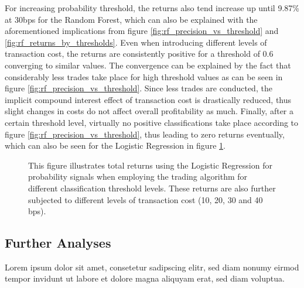 For increasing probability threshold, the returns also tend increase up until 9.87\% at 30bps for the Random Forest, 
which can also be explained with the aforementioned implications 
from figure \ref{fig:rf_precision_vs_threshold} and \ref{fig:rf_returns_by_thresholds}. 
Even when introducing different levels of transaction cost, the returns are consistently positive
for a threshold of 0.6 converging to similar values. 
The convergence can be explained by the fact that considerably less trades take place for high threshold values as can be seen in figure \ref{fig:rf_precision_vs_threshold}.
Since less trades are conducted, the implicit compound interest effect of transaction cost is drastically reduced,
thus slight changes in costs do not affect overall profitability as much. 
Finally, after a certain threshold level, virtually no positive classifications take place according to figure \ref{fig:rf_precision_vs_threshold},
thus leading to zero returns eventually, which can also be seen for the Logistic Regression in figure \ref{fig:logistic_returns_by_thresholds}.

\begin{figure}[H]
    \captionsetup{format=plain}
    \caption{ 
            This figure illustrates total returns using the Logistic Regression for probability signals when employing the trading 
            algorithm for different classification threshold levels. 
            These returns are also further subjected to different levels of transaction cost (10, 20, 30 and 40 bps).
        }
    \label{fig:logistic_returns_by_thresholds}
\end{figure}




\subsection{Further Analyses}
Lorem ipsum dolor sit amet, consetetur sadipscing elitr, sed diam nonumy eirmod tempor invidunt ut labore et dolore magna aliquyam erat, sed diam voluptua.